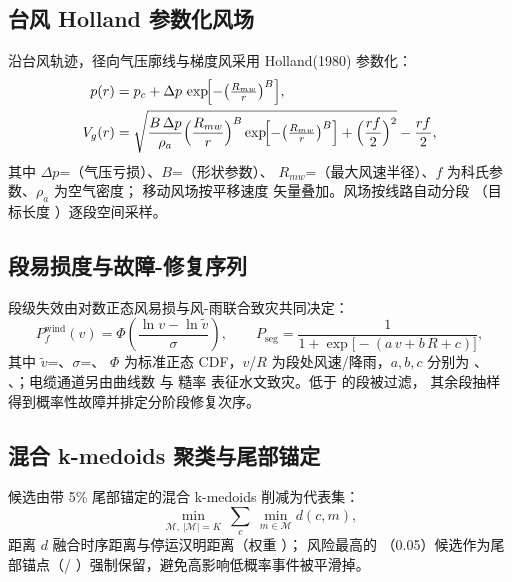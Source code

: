 \documentclass[UTF8,fontset=fandol,a4paper,11pt]{ctexart}
\begin{document}
\subsection{台风 Holland 参数化风场}
沿台风轨迹，径向气压廓线与梯度风采用 Holland(1980) 参数化：
\begin{align}
p(r) &= p_c + \Delta p \, \exp\!\Bigl[-\bigl(\tfrac{R_{mw}}{r}\bigr)^{B}\Bigr],\\
V_g(r) &= \sqrt{\frac{B\,\Delta p}{\rho_a}\Bigl(\frac{R_{mw}}{r}\Bigr)^{B}
          \exp\!\Bigl[-\bigl(\tfrac{R_{mw}}{r}\bigr)^{B}\Bigr]
          + \Bigl(\frac{r f}{2}\Bigr)^{2}} - \frac{r f}{2},
\end{align}
其中 $\Delta p$=（气压亏损）、$B$=（形状参数）、
$R_{mw}$=（最大风速半径）、$f$ 为科氏参数、$\rho_a$ 为空气密度；
移动风场按平移速度  矢量叠加。风场按线路自动分段
（目标长度 ）逐段空间采样。

\subsection{段易损度与故障-修复序列}
段级失效由对数正态风易损与风-雨联合致灾共同决定：
\begin{equation}
P_f^{\text{wind}}(v) = \Phi\!\left(\frac{\ln v - \ln \tilde v}{\sigma}\right),\qquad
P_{\text{seg}} = \frac{1}{1+\exp\!\bigl[-(a\,v + b\,R + c)\bigr]},
\end{equation}
其中 $\tilde v$=、$\sigma$=、
$\Phi$ 为标准正态 CDF，$v$/$R$ 为段处风速/降雨，$a,b,c$ 分别为 、
、；电缆通道另由曲线数  与
糙率  表征水文致灾。低于  的段被过滤，
其余段抽样得到概率性故障并排定分阶段修复次序。

\subsection{混合 k-medoids 聚类与尾部锚定}
候选由带 5\% 尾部锚定的混合 k-medoids 削减为代表集：
\begin{equation}
\min_{\mathcal{M},\,|\mathcal{M}|=K}\ \sum_{c}\ \min_{m\in\mathcal{M}} d(c,m),
\end{equation}
距离 $d$ 融合时序距离与停运汉明距离（权重 ）；
风险最高的 （0.05）候选作为尾部锚点（/
）强制保留，避免高影响低概率事件被平滑掉。
\end{document}
